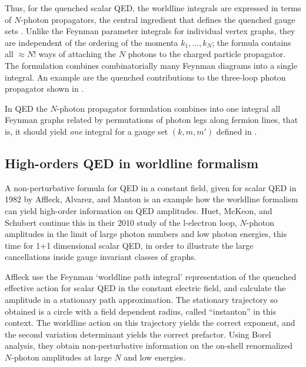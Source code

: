 Thus, for the quenched scalar QED, the worldline integrals are expressed
in terms of $N$-photon propagators, the central ingredient that defines
the quenched gauge sets .
Unlike the Feynman parameter integrals for individual vertex graphs, they are
independent of the ordering of the momenta $k_1,\ldots,k_N$; the formula
 contains all $\approx N!$ ways of attaching the $N$
photons to the charged particle propagator.
The formulation combines combinatorially many Feynman diagrams into a single integral.
An example are the quenched contributions to the
three-loop photon propagator shown in .

In QED the $N$-photon propagator formulation combines into one integral
all Feynman graphs related by permutations of photon legs along fermion
lines, that is, it should yield \emph{one} integral for a gauge set
$(k,m,m')$ defined in .

\subsection{High-orders QED in worldline formalism}
\label{sect:highQEDworldline}

A non-perturbative formula for QED in a constant field, given for scalar
QED in 1982 by Affleck, Alvarez, and Manton is an example how the
worldline formalism can yield high-order information on QED amplitudes.
Huet, McKeon, and Schubert continue this in their 2010
study of the l-electron loop, $N$-photon amplitudes in the limit of large
photon numbers and low photon energies, this time for 1+1 dimensional
scalar QED, in order to illustrate the large cancellations inside gauge
invariant classes of graphs.

Affleck \etal{} use the Feynman `worldline
path integral' representation of the quenched effective action for scalar
QED in the constant electric field, and calculate the amplitude in a
stationary path approximation. The stationary trajectory so obtained is a
circle with a field dependent radius, called ``instanton''  in this
context. The worldline action on this trajectory yields the correct
exponent, and the second variation determinant yields the correct  prefactor.
Using Borel analysis, they obtain non-perturbative information on the
on-shell renormalized $N$-photon amplitudes at large $N$ and low energies.

